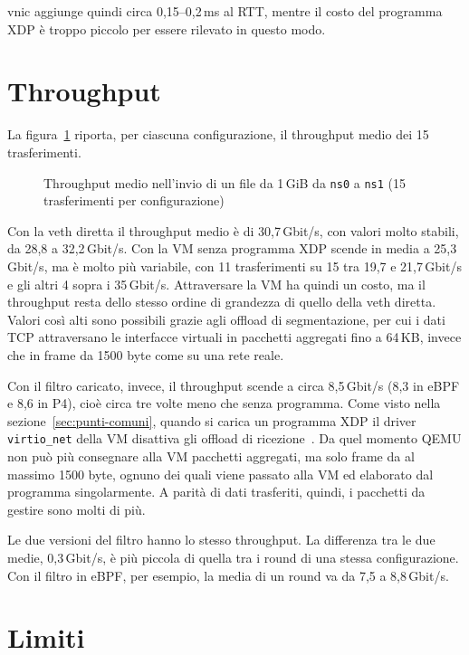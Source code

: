 vnic aggiunge quindi circa 0,15--0,2\,ms al RTT, mentre il costo del programma XDP è troppo piccolo per essere rilevato in questo modo.

\section{Throughput}\label{sec:throughput}

La figura~\ref{fig:bench-throughput} riporta, per ciascuna configurazione, il throughput medio dei 15 trasferimenti.

\begin{figure}[H]
    \centering
    
    \caption{Throughput medio nell'invio di un file da 1\,GiB da \texttt{ns0} a \texttt{ns1} (15 trasferimenti per configurazione)}
    \label{fig:bench-throughput}
\end{figure}

Con la veth diretta il throughput medio è di 30,7\,Gbit/s, con valori molto stabili, da 28,8 a 32,2\,Gbit/s. Con la VM senza programma XDP scende in media a 25,3\,Gbit/s, ma è molto più variabile, con 11 trasferimenti su 15 tra 19,7 e 21,7\,Gbit/s e gli altri 4 sopra i 35\,Gbit/s. Attraversare la VM ha quindi un costo, ma il throughput resta dello stesso ordine di grandezza di quello della veth diretta. Valori così alti sono possibili grazie agli offload di segmentazione, per cui i dati TCP attraversano le interfacce virtuali in pacchetti aggregati fino a 64\,KB, invece che in frame da 1500 byte come su una rete reale.

Con il filtro caricato, invece, il throughput scende a circa 8,5\,Gbit/s (8,3 in eBPF e 8,6 in P4), cioè circa tre volte meno che senza programma. Come visto nella sezione~\ref{sec:punti-comuni}, quando si carica un programma XDP il driver \texttt{virtio\_net} della VM disattiva gli offload di ricezione~\cite{virtio-net-src}. Da quel momento QEMU non può più consegnare alla VM pacchetti aggregati, ma solo frame da al massimo 1500 byte, ognuno dei quali viene passato alla VM ed elaborato dal programma singolarmente. A parità di dati trasferiti, quindi, i pacchetti da gestire sono molti di più.

Le due versioni del filtro hanno lo stesso throughput. La differenza tra le due medie, 0,3\,Gbit/s, è più piccola di quella tra i round di una stessa configurazione. Con il filtro in eBPF, per esempio, la media di un round va da 7,5 a 8,8\,Gbit/s.

\section{Limiti}\label{sec:limiti}

